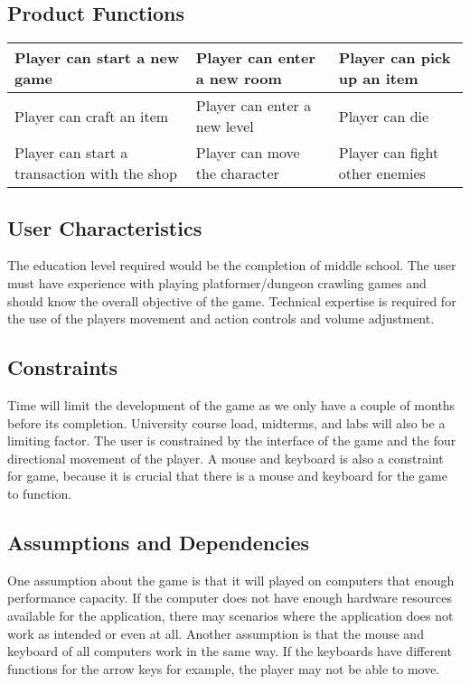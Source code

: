 \documentclass[12pt, titlepage]{article}
\begin{document}
  \subsection{Product Functions}
   \begin{center}
    \begin{tabular}{ | m{5em} | m{5em}| m{5em} | }
    \hline
    Player can start a new game & Player can enter a new room & Player can pick up an item \\
    \hline
    Player can craft an item & Player can enter a new level & Player can die \\
    \hline
    Player can start a transaction with the shop & Player can move the character & Player can fight other enemies \\
    \hline
    \end{tabular}
    \end{center}
  \subsection{User Characteristics}
  The education level required would be the completion of middle school. The user must have experience with playing platformer/dungeon crawling games and should know the overall objective of the game. Technical expertise is required for the use of the players movement and action controls and volume adjustment.
  \subsection{Constraints}
  Time will limit the development of the game as we only have a couple of months before its completion. University course load, midterms, and labs will also be a limiting factor. The user is constrained by the interface of the game and the four directional movement of the player. A mouse and keyboard is also a constraint for game, because it is crucial that there is a mouse and keyboard for the game to function. 
  \subsection{Assumptions and Dependencies}
  One assumption about the game is that it will played on computers that enough performance capacity. If the computer does not have enough hardware resources available for the application, there may scenarios where the application does not work as intended or even at all. Another assumption is that the mouse and keyboard of all computers work in the same way. If the keyboards have different functions for the arrow keys for example, the player may not be able to move.
\end{document}
